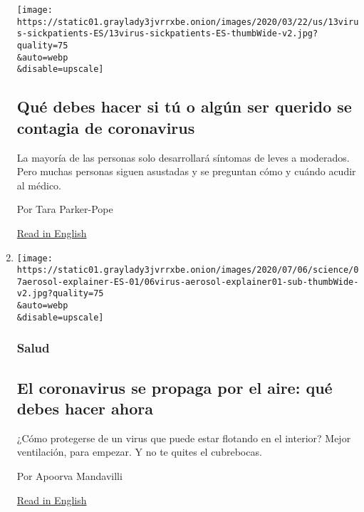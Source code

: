 \begin{enumerate}
  \texttt{[image: https://static01.graylady3jvrrxbe.onion/images/2020/03/22/us/13virus-sickpatients-ES/13virus-sickpatients-ES-thumbWide-v2.jpg?quality=75\\\&auto=webp\\\&disable=upscale]}

  \hypertarget{quuxe9-debes-hacer-si-tuxfa-o-alguxfan-ser-querido-se-contagia-de-coronavirus}{%
  \subsection{Qué debes hacer si tú o algún ser querido se contagia de
  coronavirus}\label{quuxe9-debes-hacer-si-tuxfa-o-alguxfan-ser-querido-se-contagia-de-coronavirus}}

  La mayoría de las personas solo desarrollará síntomas de leves a
  moderados. Pero muchas personas siguen asustadas y se preguntan cómo y
  cuándo acudir al médico.

  Por Tara Parker-Pope

  \href{https://www.nytimes3xbfgragh.onion/2020/03/22/well/what-if-i-have-coronavirus.html}{Read
  in English}
\item
  \href{/es/2020/07/08/espanol/ciencia-y-tecnologia/coronavirus-aire-aerosoles.html}{}

  \texttt{[image: https://static01.graylady3jvrrxbe.onion/images/2020/07/06/science/07aerosol-explainer-ES-01/06virus-aerosol-explainer01-sub-thumbWide-v2.jpg?quality=75\\\&auto=webp\\\&disable=upscale]}

  \hypertarget{salud-1}{%
  \subsubsection{Salud}\label{salud-1}}

  \hypertarget{el-coronavirus-se-propaga-por-el-aire-quuxe9-debes-hacer-ahora}{%
  \subsection{El coronavirus se propaga por el aire: qué debes hacer
  ahora}\label{el-coronavirus-se-propaga-por-el-aire-quuxe9-debes-hacer-ahora}}

  ¿Cómo protegerse de un virus que puede estar flotando en el interior?
  Mejor ventilación, para empezar. Y no te quites el cubrebocas.

  Por Apoorva Mandavilli

  \href{https://www.nytimes3xbfgragh.onion/2020/07/06/health/coronavirus-airborne-aerosols.html}{Read
  in English}
\end{enumerate}

